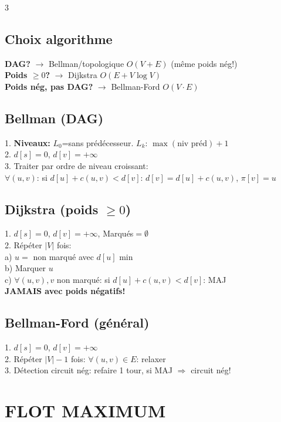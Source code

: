 \documentclass[a4paper,4pt]{article}
\begin{document}
\begin{multicols}{3}
\subsection{Choix algorithme}
{\color{red}\textbf{DAG?}} $\to$ Bellman/topologique $O(V+E)$ (m\^eme poids n\'eg!)\\
{\color{red}\textbf{Poids $\geq 0$?}} $\to$ Dijkstra $O(E+V\log V)$\\
{\color{red}\textbf{Poids n\'eg, pas DAG?}} $\to$ Bellman-Ford $O(V{\cdot}E)$

\subsection{Bellman (DAG)}
1. \textbf{Niveaux:} $L_0$=sans pr\'ed\'ecesseur. $L_k$: $\max(\text{niv pr\'ed})+1$\\
2. $d[s]=0$, $d[v]=+\infty$\\
3. Traiter par ordre de niveau croissant:\\
\hspace{4pt}$\forall (u,v)$: si $d[u]+c(u,v)<d[v]$: $d[v]=d[u]+c(u,v)$, $\pi[v]=u$

\subsection{Dijkstra (poids $\geq 0$)}
1. $d[s]=0$, $d[v]=+\infty$, Marqu\'es$=\emptyset$\\
2. R\'ep\'eter $|V|$ fois:\\
\hspace{4pt}a) $u=$ non marqu\'e avec $d[u]$ min\\
\hspace{4pt}b) Marquer $u$\\
\hspace{4pt}c) $\forall (u,v), v$ non marqu\'e: si $d[u]+c(u,v)<d[v]$: MAJ\\
\textbf{JAMAIS avec poids n\'egatifs!}

\subsection{Bellman-Ford (g\'en\'eral)}
1. $d[s]=0$, $d[v]=+\infty$\\
2. R\'ep\'eter $|V|-1$ fois: $\forall (u,v)\in E$: relaxer\\
3. D\'etection circuit n\'eg: refaire 1 tour, si MAJ $\Rightarrow$ circuit n\'eg!

\section{FLOT MAXIMUM}


\end{multicols}
\end{document}
